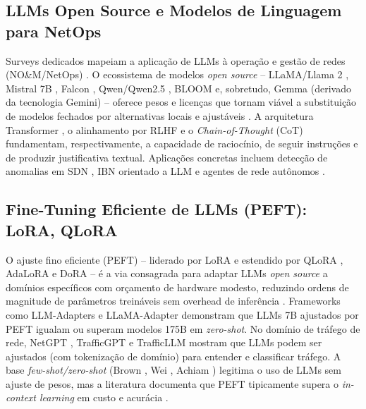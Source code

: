 \documentclass[12pt,a4paper]{article}
\begin{document}
\subsection{LLMs Open Source e Modelos de Linguagem para NetOps}
\label{sec:llm}

Surveys dedicados mapeiam a aplicação de LLMs à operação e gestão de redes
(NO\&M/NetOps) \cite{rA31}\cite{rA32}\cite{rA33}\cite{rA34}\cite{rA35}\cite{rA36}\cite{rA37}. O ecossistema de modelos
\textit{open source} -- LLaMA/Llama 2 \cite{rA310}\cite{rA311}, Mistral 7B \cite{rA312}, Falcon
\cite{rA313}, Qwen/Qwen2.5 \cite{rA314}\cite{rA315}, BLOOM \cite{rA316} e, sobretudo, Gemma
\cite{rA317} (derivado da tecnologia Gemini) -- oferece pesos e licenças que tornam
viável a substituição de modelos fechados por alternativas locais e ajustáveis
\cite{rA41}. A arquitetura Transformer \cite{rA319}, o alinhamento por RLHF \cite{rA320} e o
\textit{Chain-of-Thought} (CoT) \cite{rA321} fundamentam, respectivamente, a
capacidade de raciocínio, de seguir instruções e de produzir justificativa
textual. Aplicações concretas incluem detecção de anomalias em SDN
\cite{rA325}\cite{rA327}, IBN orientado a LLM \cite{rA324}\cite{rA332}\cite{rA333} e agentes de rede
autônomos \cite{rA338}\cite{rA334}\cite{rA335}\cite{rA336}\cite{rA337}.

\subsection{Fine-Tuning Eficiente de LLMs (PEFT): LoRA, QLoRA}
\label{sec:peft}

O ajuste fino eficiente (PEFT) -- liderado por LoRA \cite{rA41} e estendido por QLoRA
\cite{rA42}, AdaLoRA \cite{rA43} e DoRA \cite{rA44} -- é a via consagrada para adaptar LLMs
\textit{open source} a domínios específicos com orçamento de hardware modesto,
reduzindo ordens de magnitude de parâmetros treináveis sem overhead de
inferência \cite{rA45}\cite{rA49}\cite{rA415}. Frameworks como LLM-Adapters \cite{rA411} e
LLaMA-Adapter \cite{rA412} demonstram que LLMs 7B ajustados por PEFT igualam ou
superam modelos 175B em \textit{zero-shot}. No domínio de tráfego de rede,
NetGPT \cite{rA425}, TrafficGPT \cite{rA426} e TrafficLLM \cite{rA427} mostram que LLMs podem ser
ajustados (com tokenização de domínio) para entender e classificar tráfego. A
base \textit{few-shot/zero-shot} (Brown \cite{rA422}, Wei \cite{rA321}, Achiam \cite{rA424})
legitima o uso de LLMs sem ajuste de pesos, mas a literatura documenta que
PEFT tipicamente supera o \textit{in-context learning} em custo e acurácia
\cite{rA49}.
\end{document}

